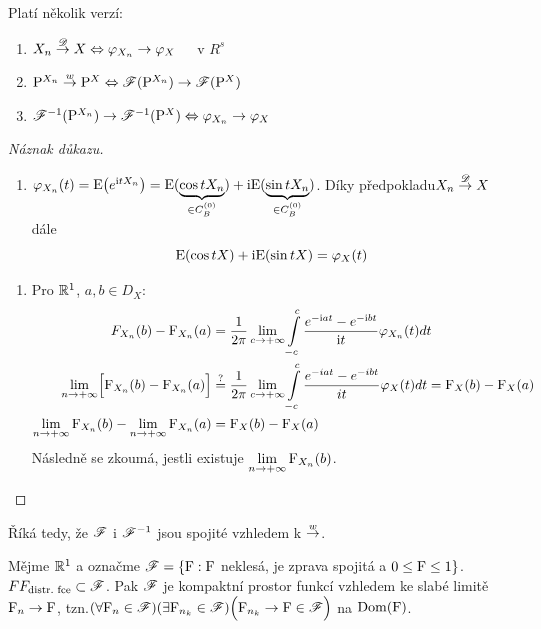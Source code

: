 \begin{theorem}
	Platí několik verzí:\begin{enumerate}
		\item $X_n\stackrel{\mathscr{D}}{\to} X \Leftrightarrow \varphi_{X_n}\to \varphi_X$~~~v $R^s$
		\item $\mathrm{P}^{X_n}\stackrel{w}{\to} \mathrm{P}^X \Leftrightarrow \mathscr{F}(\mathrm{P}^{X_n})\to \mathscr{F}(\mathrm{P}^X)$
		\item $\mathscr{F}^{-1}(\mathrm{P}^{X_n})\to \mathscr{F}^{-1}(\mathrm{P}^X)\Leftrightarrow \varphi_{X_n}\to \varphi_X$
	\end{enumerate}
\begin{proof}[Náznak důkazu]
	\begin{enumerate}[$\Rightarrow:$]
		\item $\varphi_{X_n}(t)=\mathrm{E} \bigl( e^{\mathrm{i} tX_n} \bigr)=\mathrm{E} (\underbrace{\cos tX_n}_{\in C_B^{(0)}})+\mathrm{i} \mathrm{E} (\underbrace{\sin tX_n}_{\in C_B^{(0)}})$. Díky předpokladu\newline $X_n\stackrel{\mathscr{D}}{\to} X$ dále 
		$$ \mathrm{E} (\cos tX) +\mathrm{i} \mathrm{E} (\sin tX)=\varphi_X(t) $$
	\end{enumerate}
\begin{enumerate}[$\Leftarrow:$]
\item Pro $\mathbb{R}^1$, $a,b\in D_X$:
\[
\begin{split}
F_{X_n}(b)-\mathrm{F}_{X_n}(a)&=\frac{1}{2\pi}\lim\limits_{ c\to +\infty}\int\limits_{-c}^c \frac{e^{-\mathrm{i} at}-e^{-\mathrm{i} bt}}{\mathrm{i} t}\varphi_{X_n}(t)dt \\
	\lim\limits_{ n\to +\infty} \Bigl[ \mathrm{F}_{X_n}(b)-\mathrm{F}_{X_n}(a) \Bigr]&\stackrel{?}{=}\frac{1}{2\pi}\lim\limits_{ c\to +\infty} \int\limits_{-c}^c \frac{e^{-iat}-e^{-ibt}}{it}\varphi_{X}(t)dt=\mathrm{F}_X(b)-\mathrm{F}_X(a) \\
		\lim\limits_{ n\to +\infty} \mathrm{F}_{X_n}(b)-\lim\limits_{ n\to +\infty} \mathrm{F}_{X_n}(a) &= \mathrm{F}_X(b)-\mathrm{F}_X(a)
\end{split}
\] 
		Následně se zkoumá, jestli existuje $\lim\limits_{ n\to +\infty} \mathrm{F}_{X_n}(b)$.
	\end{enumerate}
\end{proof}
\end{theorem}
\begin{remark}
	Říká tedy, že $\mathscr{F}$ i $\mathscr{F}^{-1}$ jsou spojité vzhledem k $\stackrel{w}{\to}$.
\end{remark}
\begin{theorem}[Hélly]
	Mějme $\mathbb{R}^1$ a označme $\mathscr{F}=\{ \mathrm{F}: \mathrm{F}$ neklesá, je zprava spojitá a $0\leq \mathrm{F}\leq 1 \}$. $\\FF_{\text{distr.~fce}}\subset\mathscr{F}$.\newline
	Pak $\mathscr{F}$ je kompaktní prostor funkcí vzhledem ke slabé limitě $\mathrm{F}_n\rightarrow\mathrm{F}$, tzn.\newline $(\forall \mathrm{F}_n\in\mathscr{F})(\exists \mathrm{F}_{n_k}\in\mathscr{F})\Bigl( \mathrm{F}_{n_k}\rightarrow\mathrm{F} \in\mathscr{F} \Bigr)$ na $\mathop{\mathrm{Dom} (\mathrm{F})}$.
\end{theorem}
